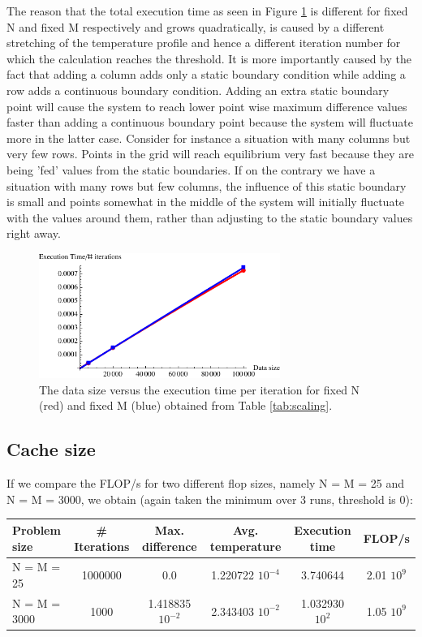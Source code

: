 \documentclass[11pt,a4paper,onecolumn]{article}
\begin{document}
The reason that the total execution time as seen in Figure \ref{fig:scaling} is different for fixed N and fixed M respectively and grows quadratically, is caused by a different stretching of the temperature profile and hence a different iteration number for which the calculation reaches the threshold. It is more importantly caused by the fact that adding a column adds only a static boundary condition while adding a row adds a continuous boundary condition. Adding an extra static boundary point will cause the system to reach lower point wise maximum difference values faster than adding a continuous boundary point because the system will fluctuate more in the latter case. Consider for instance a situation with many columns but very few rows. Points in the grid will reach equilibrium very fast because they are being 'fed' values from the static boundaries. If on the contrary we have a situation with many rows but few columns, the influence of this static boundary is small and points somewhat in the middle of the system will initially fluctuate with the values around them, rather than adjusting to the static boundary values right away. 

\begin{figure}[H]
  \centering
  \includegraphics[width=0.7\textwidth]{scalingf.pdf}
  \caption{The data size versus the execution time per iteration for fixed N (red) and fixed M (blue) obtained from Table \ref{tab:scaling}.}
  \label{fig:scaling}
\end{figure}

\subsection{Cache size}
If we compare the FLOP/s for two different flop sizes, namely N = M = 25 and N = M = 3000, we obtain (again taken the minimum over 3 runs, threshold is 0):

\begin{table}[H]
  \centering
  \begin{tabular}{l | c | c | c | c | c}
    Problem size & \# Iterations & Max. difference & Avg. temperature & Execution time & FLOP/s \\
    \hline
    N = M = 25 & 1000000 & 0.0 & 1.220722 $10^{-4}$ & 3.740644 & 2.01 $10^9$ \\
    N = M = 3000 & 1000 & 1.418835 $10^{-2}$ & 2.343403 $10^{-2}$ & 1.032930 $10^2$ & 1.05 $10^9$
  \end{tabular}
\end{table}
\end{document}
